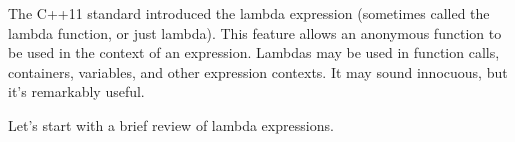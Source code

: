 The C++11 standard introduced the lambda expression (sometimes called the lambda function, or just lambda). This feature allows an anonymous function to be used in the context of an expression. Lambdas may be used in function calls, containers, variables, and other expression contexts. It may sound innocuous, but it's remarkably useful.

Let's start with a brief review of lambda expressions.